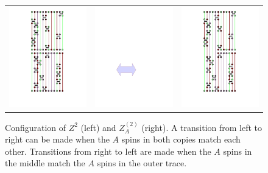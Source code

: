 \documentclass[aps,prb,reprint,floatfix]{revtex4-1}
\begin{document}
\begin{figure}[htb]
\centering
\begin{tabular}{m{} m{} m{}} 
\includegraphics[width=.13\textwidth]{12chain_z2_test_cropped1.pdf} & 
\includegraphics[width=.07\textwidth,height=.03\textheight]{arrow2.pdf} &
\includegraphics[width=.13\textwidth]{12chain_mod_z2_test_cropped1.pdf} 
\end{tabular}
\caption{Configuration of $Z^{2}$ (left) and $Z^{(2)}_{A}$ (right).  A transition from left to right can be made when the $A$ spins in both copies match each other.  Transitions from right to left are made when the $A$ spins in the middle match the $A$ spins in the outer trace. }
\label{fig:ExtendedEnsemble}
\end{figure}







\end{document}
